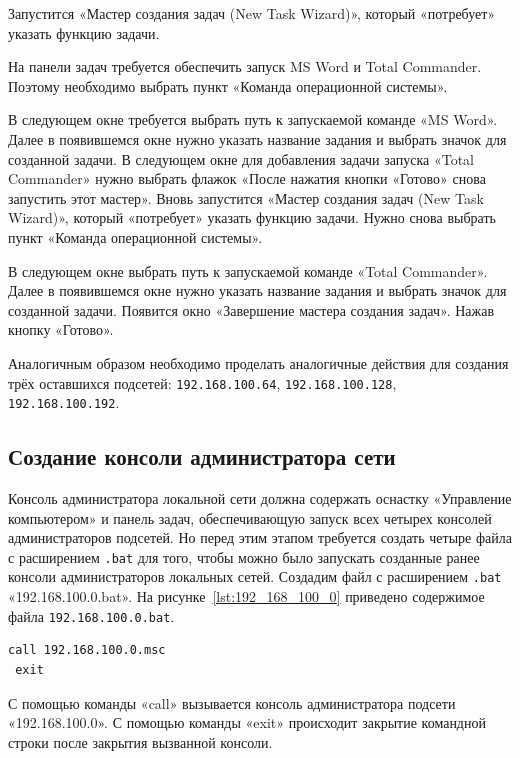 Запустится «Мастер создания задач (New Task Wizard)»,
который «потребует» указать функцию задачи.

На панели задач требуется обеспечить запуск MS Word и Total Commander.
Поэтому необходимо выбрать пункт «Команда операционной системы».

В следующем окне требуется выбрать путь к запускаемой команде «MS Word».
Далее в появившемся окне нужно указать название задания и выбрать
значок для созданной задачи. В следующем окне для добавления задачи
запуска «Total Commander» нужно выбрать флажок «После нажатия кнопки «Готово»
снова запустить этот мастер».
Вновь запустится «Мастер создания задач (New Task Wizard)»,
который «потребует» указать функцию задачи.
Нужно снова выбрать пункт «Команда операционной системы».

В следующем окне выбрать путь к запускаемой команде «Total Commander».
Далее в появившемся окне нужно указать название задания и выбрать значок
для созданной задачи. Появится окно «Завершение мастера создания задач».
Нажав кнопку «Готово».


Аналогичным образом необходимо проделать аналогичные действия для создания
трёх оставшихся подсетей: \texttt{192.168.100.64}, \texttt{192.168.100.128},
\texttt{192.168.100.192}.

\subsection{Создание консоли администратора сети}

Консоль администратора локальной сети должна содержать оснастку «Управление компьютером»
и панель задач, обеспечивающую запуск всех четырех консолей администраторов подсетей.
Но перед этим этапом требуется создать четыре файла с расширением \texttt{.bat}
для того, чтобы можно было запускать созданные ранее консоли администраторов
локальных сетей. Создадим файл с расширением \texttt{.bat} «192.168.100.0.bat».
На рисунке~\ref{lst:192_168_100_0} приведено содержимое файла \texttt{192.168.100.0.bat}.

\begin{lstlisting}[caption={Содержимое файла \texttt{192.168.100.0.bat}},
label=lst:192_168_100_0]
 call 192.168.100.0.msc
 exit
\end{lstlisting}

С помощью команды «call» вызывается консоль администратора
подсети «192.168.100.0». С помощью команды «exit» происходит закрытие командной
строки после закрытия вызванной консоли.

